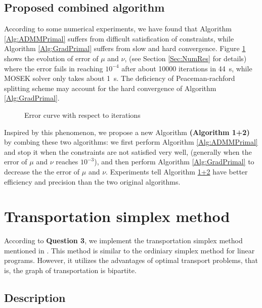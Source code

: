 \documentclass[english]{pkupaper}
\begin{document}
\subsection{Proposed combined algorithm}

According to some numerical experiments, we have found that Algorithm \ref{Alg:ADMMPrimal} suffers from difficult satisfication of constraints, while Algorithm \ref{Alg:GradPrimal} suffers from slow and hard convergence. Figure \ref{Fig:Loss} shows the evolution of error of $\mu$ and $\nu$, (see Section \ref{Sec:NumRes} for details) where the error fails in reaching $10^{-4}$ after about 10000 iterations in \SI{44}{\second}, while MOSEK solver only takes about \SI{1}{\second}. The deficiency of Peaceman-rachford splitting scheme may account for the hard convergence of Algorithm \ref{Alg:GradPrimal}.

\begin{figure}
\centering \scalebox{0.65}{} 
\caption{Error curve with respect to iterations} \label{Fig:Loss}
\end{figure}

Inspired by this phenomenon, we propose a new Algorithm \textbf{(Algorithm \hypertarget{EAlg:12}{1+2})} by combing these two algorithms: we first perform Algorithm \ref{Alg:ADMMPrimal} and stop it when the constraints are not satisfied very well, (generally when the error of $\mu$ and $\nu$ reaches $10^{-3}$), and then perform Algorithm \ref{Alg:GradPrimal} to decrease the the error of $\mu$ and $\nu$. Experiments tell Algorithm \hyperlink{EAlg:12}{1+2} have better efficiency and precision than the two original algorithms.

\section{Transportation simplex method} \label{Sec:TS}

According to \textbf{Question 3}, we implement the transportation simplex method mentioned in \parencite{Schrieber2017}. This method is similar to the ordiniary simplex method for linear programs. However, it utilizes the advantages of optimal transport problems, that is, the graph of transportation is bipartite.

\subsection{Description}
\end{document}
